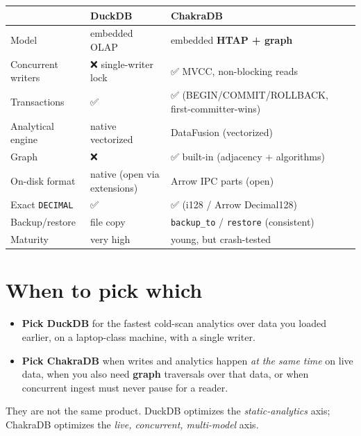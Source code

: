 \documentclass[
  11pt,
  openany]{book}
\providecommand{\tightlist}{%
  \setlength{\itemsep}{0pt}\setlength{\parskip}{0pt}}
\begin{document}
\begin{longtable}[]{@{}
  >{\raggedright\arraybackslash}p{}
  >{\raggedright\arraybackslash}p{}
  >{\raggedright\arraybackslash}p{}@{}}
\toprule\noalign{}
\begin{minipage}[b]{\linewidth}\raggedright
\end{minipage} & \begin{minipage}[b]{\linewidth}\raggedright
DuckDB
\end{minipage} & \begin{minipage}[b]{\linewidth}\raggedright
ChakraDB
\end{minipage} \\
\midrule\noalign{}
\endhead
\bottomrule\noalign{}
\endlastfoot
Model & embedded OLAP & embedded \textbf{HTAP + graph} \\
Concurrent writers & ❌ single-writer lock & ✅ MVCC, non-blocking
reads \\
Transactions & ✅ & ✅ (BEGIN/COMMIT/ROLLBACK, first-committer-wins) \\
Analytical engine & native vectorized & DataFusion (vectorized) \\
Graph & ❌ & ✅ built-in (adjacency + algorithms) \\
On-disk format & native (open via extensions) & Arrow IPC parts
(open) \\
Exact \texttt{DECIMAL} & ✅ & ✅ (i128 / Arrow Decimal128) \\
Backup/restore & file copy & \texttt{backup\_to} / \texttt{restore}
(consistent) \\
Maturity & very high & young, but crash-tested \\
\end{longtable}

\section{When to pick which}\label{when-to-pick-which}

\begin{itemize}
\tightlist
\item
  \textbf{Pick DuckDB} for the fastest cold-scan analytics over data you
  loaded earlier, on a laptop-class machine, with a single writer.
\item
  \textbf{Pick ChakraDB} when writes and analytics happen \emph{at the
  same time} on live data, when you also need \textbf{graph} traversals
  over that data, or when concurrent ingest must never pause for a
  reader.
\end{itemize}

They are not the same product. DuckDB optimizes the
\emph{static-analytics} axis; ChakraDB optimizes the \emph{live,
concurrent, multi-model} axis.

\backmatter
\end{document}
